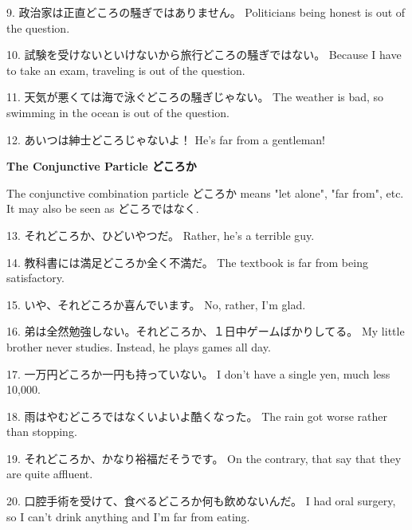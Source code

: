 \par{9. 政治家は正直どころの騒ぎではありません。 \hfill\break
Politicians being honest is out of the question. }

\par{10. 試験を受けないといけないから旅行どころの騒ぎではない。 \hfill\break
Because I have to take an exam, traveling is out of the question. }

\par{11. 天気が悪くては海で泳ぐどころの騒ぎじゃない。 \hfill\break
The weather is bad, so swimming in the ocean is out of the question. }

\par{12. あいつは紳士どころじゃないよ！ \hfill\break
He's far from a gentleman! }

\par{\textbf{The Conjunctive Particle どころか } }

\par{The conjunctive combination particle どころか means "let alone", "far from", etc. It may also be seen as どころではなく. }

\par{13. それどころか、ひどいやつだ。 \hfill\break
Rather, he's a terrible guy. }

\par{14. 教科書には満足どころか全く不満だ。 \hfill\break
The textbook is far from being satisfactory. }

\par{15. いや、それどころか喜んでいます。 \hfill\break
No, rather, I'm glad. }

\par{16. 弟は全然勉強しない。それどころか、１日中ゲームばかりしてる。 \hfill\break
My little brother never studies. Instead, he plays games all day. }

\par{17. 一万円どころか一円も持っていない。 \hfill\break
I don't have a single yen, much less 10,000. }

\par{18. 雨はやむどころではなくいよいよ酷くなった。 \hfill\break
The rain got worse rather than stopping. }

\par{19. それどころか、かなり裕福だそうです。 \hfill\break
On the contrary, that say that they are quite affluent. }

\par{20. 口腔手術を受けて、食べるどころか何も飲めないんだ。 \hfill\break
I had oral surgery, so I can't drink anything and I'm far from eating. }
    
